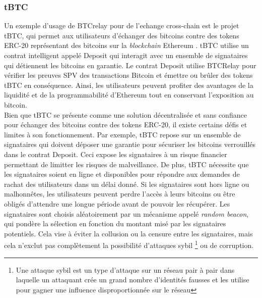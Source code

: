 \subsubsection{tBTC}
Un exemple d'usage de BTCrelay pour de l'echange \gls{cross-chain} est le projet tBTC, qui permet aux utilisateurs d’échanger des bitcoins contre des 
tokens ERC-20 représentant des bitcoins sur la \textit{\gls{blockchain}} Ethereum \cite{hildebrandt2020tokenization,lan2021horizon}. tBTC utilise un contrat intelligent 
appelé Deposit qui interagit avec un ensemble de signataires qui détiennent les bitcoins en garantie. 
Le contrat Deposit utilise BTCRelay pour vérifier les preuves SPV des transactions Bitcoin et émettre ou 
brûler des tokens tBTC en conséquence. Ainsi, les utilisateurs peuvent profiter des avantages de la liquidité 
et de la programmabilité d’Ethereum tout en conservant l’exposition au bitcoin. \\
Bien que tBTC se présente comme une solution décentralisée et sans confiance pour échanger des bitcoins contre 
des tokens ERC-20, il existe certains défis et limites à son fonctionnement. 
Par exemple, tBTC repose sur un ensemble de signataires qui doivent déposer une garantie pour sécuriser les bitcoins
verrouillés dans le contrat Deposit. Ceci expose les signataires à un risque financier permettant de limitter les risques de malveillance. 
De plus, tBTC nécessite que les signataires soient en ligne et disponibles pour répondre aux demandes de rachat des 
utilisateurs dans un délai donné. Si les signataires sont hors ligne ou malhonnêtes, les utilisateurs peuvent 
perdre l’accès à leurs bitcoins ou être obligés d’attendre une longue période avant de pouvoir les récupérer. 
Les signataires sont choisis aléatoirement par un mécanisme appelé \textit{random beacon}, qui pondère la sélection en 
fonction du montant misé par les signataires potentiels. Cela vise à éviter la collusion ou la censure entre les 
signataires, mais cela n’exclut pas complètement la possibilité d’attaques sybil \footnote{Une attaque sybil est 
un type d’attaque sur un réseau pair à pair dans laquelle un attaquant crée un grand nombre d’identités fausses 
et les utilise pour gagner une influence disproportionnée sur le réseau} ou de corruption.